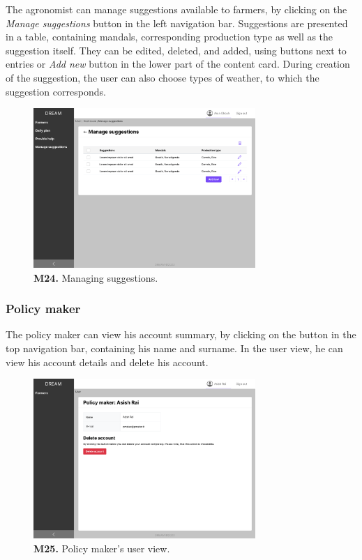     The agronomist can manage suggestions available to farmers, by clicking on the \textit{Manage suggestions} button in the left navigation bar. Suggestions are presented in a table, containing mandals, corresponding production type as well as the suggestion itself. They can be edited, deleted, and added, using buttons next to entries or \textit{Add new} button in the lower part of the content card. During creation of the suggestion, the user can also choose types of weather, to which the suggestion corresponds.
    \begin{figure}[H]
        \centering
        \includegraphics[width=0.75\textwidth]{mockups/Agronomist_Dashboard_Manage suggestions.png}
        \caption{\textbf{M24.} Managing suggestions.}
    \end{figure}
    
    \subsubsection{Policy maker}
    
    The policy maker can view his account summary, by clicking on the button in the top navigation bar, containing his name and surname. In the user view, he can view his account details and delete his account.
    \begin{figure}[H]
        \centering
        \includegraphics[width=0.75\textwidth]{mockups/Policy maker_User.png}
        \caption{\textbf{M25.} Policy maker's user view.}
    \end{figure}
    

